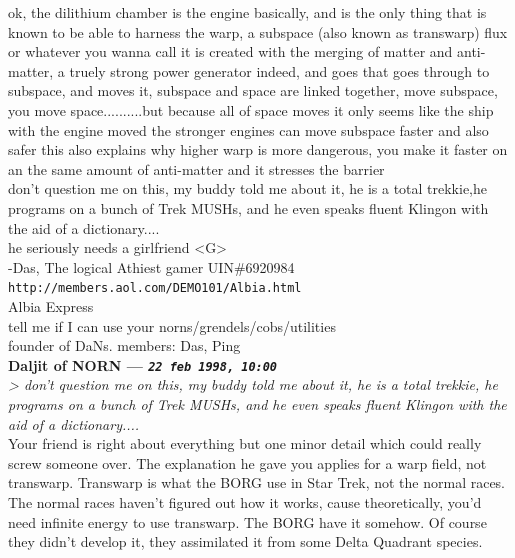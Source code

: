 \documentclass[11pt,twoside,a4paper]{article}
\begin{document}
\begin{multicols*}{2}
ok, the dilithium chamber is the engine basically, and is the only thing that is known to be able to harness the warp, a subspace (also known as transwarp) flux or whatever you wanna call it is created with the merging of matter and anti-matter, a truely strong power generator indeed, and goes that goes through to subspace, and moves it, subspace and space are linked together, move subspace, you move space..........but because all of space moves it only seems like the ship with the engine moved the stronger engines can move subspace faster and also safer this also explains why higher warp is more dangerous, you make it faster on an the same amount of anti-matter and it stresses the barrier~\\

don't question me on this, my buddy told me about it, he is a total trekkie,he programs on a bunch of Trek MUSHs, and he even speaks fluent Klingon with the aid of a dictionary....~\\

he seriously needs a girlfriend <G>~\\
                               -Das, The logical Athiest gamer   UIN\#6920984~\\
\texttt{http://members.aol.com/DEMO101/Albia.html}~\\
Albia Express~\\
tell me if I can use your norns/grendels/cobs/utilities~\\
founder of DaNs. members: Das, Ping~\\

 
		
	
		
\textbf{Daljit of NORN --- \emph{\texttt{22 feb 1998, 10:00}}}~\\

\emph{> don't question me on this, my buddy told me about it, he is a total trekkie, he programs on a bunch of Trek MUSHs, and he even speaks fluent Klingon with the aid of a dictionary....}~\\

Your friend is right about everything but one minor detail which could really screw someone over.  The explanation he gave you applies for a warp field, not transwarp.  Transwarp is what the BORG use in Star Trek, not the normal races.  The normal races haven't figured out how it works, cause theoretically, you'd need infinite energy to use transwarp.  The BORG have it somehow.  Of course they didn't develop it, they assimilated it from some Delta Quadrant species.~\\


\end{multicols*}
\end{document}
